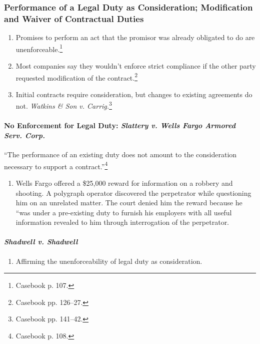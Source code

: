 \subsubsection{Performance of a Legal Duty as Consideration; Modification and 
Waiver of Contractual Duties}

\begin{enumerate}
    \item Promises to perform an act that the promisor was already obligated 
    to do are unenforceable.\footnote{Casebook p. 107.}
    \item Most companies say they wouldn't enforce strict compliance if the 
    other party requested modification of the contract.\footnote{Casebook pp. 
    126--27.}
    \item Initial contracts require consideration, but changes to existing 
    agreements do not. \emph{Watkins \& Son v. Carrig.}\footnote{Casebook pp. 
    141--42.}
\end{enumerate}

\paragraph{No Enforcement for Legal Duty: \emph{Slattery v. Wells Fargo 
Armored Serv. Corp.}}

``The performance of an existing duty does not amount to the consideration 
necessary to support a contract.''\footnote{Casebook p. 108.}

\begin{enumerate}
    \item Wells Fargo offered a \$25,000 reward for information on a robbery 
    and shooting. A polygraph operator discovered the perpetrator while 
    questioning him on an unrelated matter. The court denied him the reward 
    because he ``was under a pre-existing duty to furnish his employers with 
    all useful information revealed to him through interrogation of the 
    perpetrator.
\end{enumerate}

\paragraph{\emph{Shadwell v. Shadwell}}

\begin{enumerate}
    \item Affirming the unenforceability of legal duty as consideration.
\end{enumerate}

